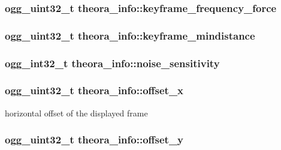 \subsubsection[{keyframe\-\_\-frequency\-\_\-force}]{\setlength{\rightskip}{0pt plus 5cm}ogg\-\_\-uint32\-\_\-t {\bf theora\-\_\-info\-::keyframe\-\_\-frequency\-\_\-force}}\label{structtheora__info_ad9d2e22c44a53473010e6d1042dfe0d8}
\subsubsection[{keyframe\-\_\-mindistance}]{\setlength{\rightskip}{0pt plus 5cm}ogg\-\_\-uint32\-\_\-t {\bf theora\-\_\-info\-::keyframe\-\_\-mindistance}}\label{structtheora__info_aa79ca8c0e77a884d4487fd627fae32e9}
\subsubsection[{noise\-\_\-sensitivity}]{\setlength{\rightskip}{0pt plus 5cm}ogg\-\_\-int32\-\_\-t {\bf theora\-\_\-info\-::noise\-\_\-sensitivity}}\label{structtheora__info_ac4789034f547b57d1075e035050eeed9}
\subsubsection[{offset\-\_\-x}]{\setlength{\rightskip}{0pt plus 5cm}ogg\-\_\-uint32\-\_\-t {\bf theora\-\_\-info\-::offset\-\_\-x}}\label{structtheora__info_af5949a02bef29512f2705e6f6c944e3b}


horizontal offset of the displayed frame 

\subsubsection[{offset\-\_\-y}]{\setlength{\rightskip}{0pt plus 5cm}ogg\-\_\-uint32\-\_\-t {\bf theora\-\_\-info\-::offset\-\_\-y}}\label{structtheora__info_a91c3922097ba32a85acd584a01dc2c93}


